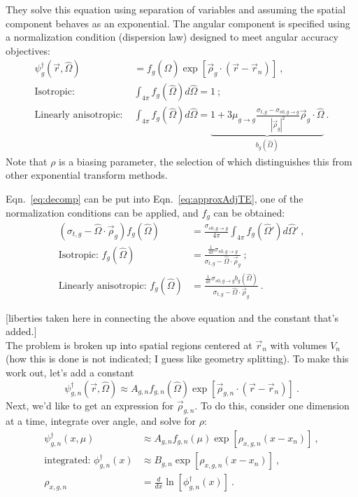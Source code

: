 \documentclass[12pt,twoside]{article}
\newcommand{\vOmega}{\ensuremath{\hat{\Omega}}}
\begin{document}
They solve this equation using separation of variables and assuming the spatial component behaves as an exponential. The angular component is specified using a normalization condition (dispersion law) designed to meet angular accuracy objectives:
\begin{align}
  \psi^{\dagger}_{g} (\vec{r}, \vOmega) &= f_g(\vOmega) \exp[\vec{\rho}_{g} \cdot (\vec{r} - \vec{r}_n)] \:, \label{eq:decomp}\\
  \text{Isotropic: }& \int_{4 \pi} f_g(\vOmega) d\vOmega = 1 \:; \label{eq:fIsoNorm}\\
  \text{Linearly anisotropic: }& \int_{4 \pi} f_g(\vOmega) d\vOmega = \underbrace{1 + 3 \mu_{g \rightarrow g} \frac{\sigma_{t,g} - \sigma_{s0,g \rightarrow g}}{|\vec{\rho}_{g}|^2} \vec{\rho}_{g} \cdot \vOmega}_{b_g(\vOmega)}  \:. \label{eq:fAnisoNorm}
\end{align}
Note that $\rho$ is a biasing parameter, the selection of which distinguishes this from other exponential transform methods. 

Eqn.~\eqref{eq:decomp} can be put into Eqn.~\eqref{eq:approxAdjTE}, one of the normalization conditions can be applied, and $f_g$ can be obtained:
\begin{align}
  (\sigma_{t,g} - \vOmega \cdot \vec{\rho}_{g})f_g(\vOmega) &= \frac{\sigma_{s0, g \rightarrow g}}{4 \pi} \int_{4 \pi} f_g(\vOmega') d\vOmega' \:,\\
   \text{Isotropic: } f_g(\vOmega) &= \frac{\frac{1}{4 \pi}\sigma_{s0, g \rightarrow g}}{\sigma_{t,g} - \vOmega \cdot \vec{\rho}_{g}} \:; \label{eq:fIso}\\
   \text{Linearly anisotropic: } f_g(\vOmega) &= \frac{\frac{1}{4 \pi}\sigma_{s0, g \rightarrow g} b_g(\vOmega)}{\sigma_{t,g} - \vOmega \cdot \vec{\rho}_{g}} \:.\label{eq:fAniso}
\end{align}

[liberties taken here in connecting the above equation and the constant that's added.]\\
The problem is broken up into spatial regions centered at $\vec{r}_n$ with volumes $V_n$ (how this is done is not indicated; I guess like geometry splitting). To make this work out, let's add a constant
$$\psi^{\dagger}_{g,n} (\vec{r}, \vOmega) \approx A_{g,n} f_{g,n}(\vOmega) \exp[\vec{\rho}_{g,n} \cdot (\vec{r} - \vec{r}_n)]\:.$$
Next, we'd like to get an expression for $\vec{\rho}_{g,n}$. To do this, consider one dimension at a time, integrate over angle, and solve for $\rho$:
\begin{align}
  \psi^{\dagger}_{g,n} (x, \mu) &\approx A_{g,n} f_{g,n}(\mu) \exp[\rho_{x,g,n} (x - x_n)] \:, \\
  \text{integrated: } \phi^{\dagger}_{g,n} (x) &\approx B_{g,n} \exp[\rho_{x,g,n} (x - x_n)] \:, \\
  \rho_{x,g,n} &= \frac{d}{dx}\ln[\phi^{\dagger}_{g,n} (x)] \:. \label{eq:ln}
\end{align}
\end{document}
